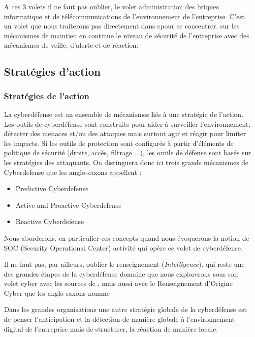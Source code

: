 A ces 3 volets il ne faut pas oublier, le volet administration des briques informatique et de télécommunications de l’environnement de l’entreprise. C’est un volet que nous traiterons pas directement dans c\edoc pour se concentrer. sur les mécanismes de maintien en continue le niveau de sécurité de l’entreprise avec des mécanismes de veille, d’alerte et de réaction.




\subsection{Stratégies d'action}

\begin{frame}
\frametitle<presentation>{Stratégies de l'action}

La cyberdéfense est un ensemble de mécanismes liés à une stratégie de l'action. Les outils de cyberdéfense sont construits pour aider à surveiller l'environnement, détecter des menaces et/ou des attaques mais surtout agir et réagir pour limiter les impacts. Si les outils de protection sont configurés à partir d'éléments de politique de sécurité (droits, accès, filtrage ...), les outils de défense sont basés sur les stratégies des attaquants.
On distinguera donc ici trois grands mécanismes de Cyberdefense que les anglo-saxons appellent : 

\begin{itemize}
	\item Predictive Cyberdefense
	\item Active and Proactive Cyberdefense
	\item Reactive Cyberdefense 
\end{itemize}
\end{frame}

Nous aborderons, en particulier ces concepts quand nous évoquerons la notion de SOC (Security Operational Center) activité qui opère ce volet de cyberdéfense.

Il ne faut pas, par ailleurs, oublier le renseignement (\textit{Intelligence}). qui reste une des grandes étapes de la cyberdéfense domaine que nous explorerons sous son volet cyber avec les sources de , mais aussi avec le Renseignement d'Origine Cyber que les anglo-saxons nomme 

Dans les grandes organisations une autre stratégie globale de la cyberdéfense est de penser l'anticipation et la détection de manière globale à l'environnement digital de l'entreprise mais de structurer, la réaction de manière locale. 

